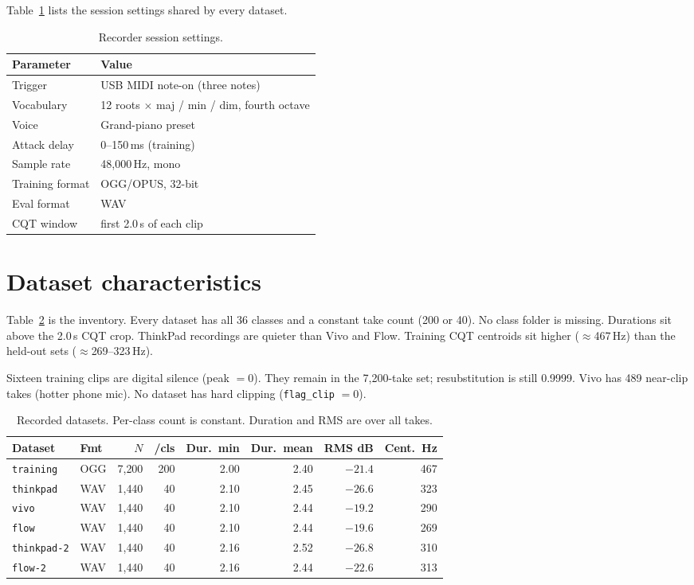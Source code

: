 \documentclass[pdflatex,sn-mathphys-num]{sn-jnl}
\begin{document}
Table~\ref{tab:esm-session} lists the session settings shared by every dataset.

\begin{table}[t]
\caption{Recorder session settings.}\label{tab:esm-session}
\begin{tabular}{@{}ll@{}}
\toprule
Parameter & Value \\
\midrule
Trigger & USB MIDI note-on (three notes) \\
Vocabulary & 12 roots $\times$ maj / min / dim, fourth octave \\
Voice & Grand-piano preset \\
Attack delay & 0--150\,ms (training) \\
Sample rate & 48{,}000\,Hz, mono \\
Training format & OGG/OPUS, 32-bit \\
Eval format & WAV \\
CQT window & first 2.0\,s of each clip \\
\bottomrule
\end{tabular}
\end{table}

\section{Dataset characteristics}

Table~\ref{tab:esm-inventory} is the inventory. Every dataset has all 36 classes and a constant take count (200 or 40). No class folder is missing. Durations sit above the 2.0\,s CQT crop. ThinkPad recordings are quieter than Vivo and Flow. Training CQT centroids sit higher ($\approx$467\,Hz) than the held-out sets ($\approx$269--323\,Hz).

Sixteen training clips are digital silence (peak $=0$). They remain in the 7{,}200-take set; resubstitution is still 0.9999. Vivo has 489 near-clip takes (hotter phone mic). No dataset has hard clipping (\texttt{flag\_clip} $=0$).

\begin{table}[t]
\caption{Recorded datasets. Per-class count is constant. Duration and RMS are over all takes.}\label{tab:esm-inventory}
\setlength{\tabcolsep}{3.2pt}
\begin{tabular}{@{}llrrrrrr@{}}
\toprule
Dataset & Fmt & $N$ & /cls & Dur.\ min & Dur.\ mean & RMS dB & Cent.\ Hz \\
\midrule
\texttt{training} & OGG & 7{,}200 & 200 & 2.00 & 2.40 & $-21.4$ & 467 \\
\texttt{thinkpad} & WAV & 1{,}440 & 40 & 2.10 & 2.45 & $-26.6$ & 323 \\
\texttt{vivo} & WAV & 1{,}440 & 40 & 2.10 & 2.44 & $-19.2$ & 290 \\
\texttt{flow} & WAV & 1{,}440 & 40 & 2.10 & 2.44 & $-19.6$ & 269 \\
\texttt{thinkpad-2} & WAV & 1{,}440 & 40 & 2.16 & 2.52 & $-26.8$ & 310 \\
\texttt{flow-2} & WAV & 1{,}440 & 40 & 2.16 & 2.44 & $-22.6$ & 313 \\
\bottomrule
\end{tabular}
\end{table}
\end{document}
